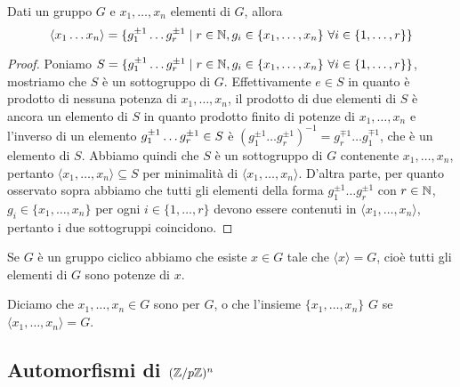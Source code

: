 \documentclass[11pt]{scrartcl}
\begin{document}
\begin{proposition}
Dati un gruppo $G$ e $x_1, \ldots, x_n$ elementi di $G$, allora \[
    \langle x_1 \ldots x_n\rangle = \{g_1^{\pm 1} \ldots g_r^{\pm 1}\mid r 
    \in \mathbb N, g_i \in \{x_1, \ldots, x_n\}~\forall i \in \{1, \ldots, r\}\}
    \]
\end{proposition}

\begin{proof}
Poniamo $S = \{g_1^{\pm 1} \ldots g_r^{\pm 1}\mid r \in \mathbb N, g_i \in \{x_1, \ldots, x_n\}
~\forall i \in \{1, \ldots, r\}\}$, mostriamo che $S$ è un sottogruppo di $G$. 
Effettivamente $e \in S$ in quanto è prodotto di nessuna potenza di $x_1, \ldots, x_n$, 
il prodotto di due elementi di $S$ è ancora un elemento di $S$ in quanto
prodotto finito di potenze di $x_1, \ldots, x_n$ e l'inverso di un elemento
$g_1^{\pm 1}\ldots g_r^{\pm 1} \in\nolinebreak S$ è $(g_1^{\pm 1}\ldots 
g_r^{\pm 1})^{-1} = g_r^{\mp 1}\ldots g_1^{\mp 1}$, che è un elemento di $S$.
Abbiamo quindi che $S$ è un sottogruppo di $G$ contenente $x_1, \ldots, x_n$,
pertanto $\langle x_1, \ldots, x_n\rangle\subseteq S$ per minimalità di $\langle x_1,
\ldots, x_n\rangle$. D'altra parte, per quanto osservato sopra abbiamo che
tutti gli elementi della forma $g_1^{\pm 1}\ldots g_r^{\pm 1}$ con $r \in \mathbb N$, 
$g_i \in \{x_1, \ldots, x_n\}$ per ogni $i \in \{1, \ldots, r\}$ devono essere
contenuti in $\langle x_1, \ldots, x_n\rangle$, pertanto i due sottogruppi
coincidono.
\end{proof}

\begin{remark}
    Se $G$ è un gruppo ciclico abbiamo che esiste $x \in G$ tale che 
    $\langle x\rangle = G$, cioè tutti gli elementi di $G$ sono potenze di $x$.
\end{remark}

Diciamo che $x_1, \ldots, x_n \in G$ sono  per $G$, o che 
l'insieme $\{x_1, \ldots, x_n\}$  $G$ se $\langle x_1, \ldots, x_n\rangle = G$.

\newpage

\subsection{Automorfismi di $({\mathbb Z}/p{\mathbb Z})^n$}
\label{sez1.2}
\end{document}
